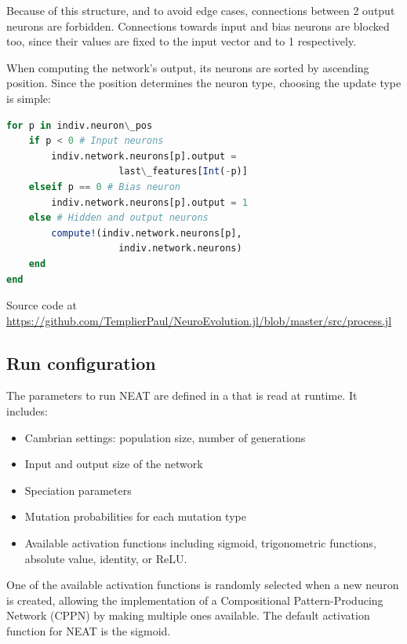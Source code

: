 Because of this structure, and to avoid edge cases, connections between 2 output neurons are forbidden. Connections towards input and bias neurons are blocked too, since their values are fixed to the input vector and to 1 respectively.

When computing the network's output, its neurons are sorted by ascending position. Since the position determines the neuron type, choosing the update type is simple:

\begin{minipage}{\linewidth}
\begin{lstlisting}[language=Julia, caption=NEAT network processing]
for p in indiv.neuron\_pos
    if p < 0 # Input neurons
        indiv.network.neurons[p].output = 
                    last\_features[Int(-p)]
    elseif p == 0 # Bias neuron
        indiv.network.neurons[p].output = 1
    else # Hidden and output neurons
        compute!(indiv.network.neurons[p], 
                    indiv.network.neurons)
    end
end
\end{lstlisting}
Source code at \url{https://github.com/TemplierPaul/NeuroEvolution.jl/blob/master/src/process.jl}\\
\end{minipage}

\subsection{Run configuration}

The parameters to run NEAT are defined in a   that is read at runtime. It includes:

\begin{itemize}
    \item Cambrian settings: population size, number of generations
    \item Input and output size of the network
    \item Speciation parameters
    \item Mutation probabilities for each mutation type
    \item Available activation functions including sigmoid, trigonometric functions, absolute value, identity, or ReLU. 
\end{itemize}

One of the available activation functions is randomly selected when a new neuron is created, allowing the implementation of a Compositional Pattern-Producing Network (CPPN) by making multiple ones available. The default activation function for NEAT is the sigmoid. 

